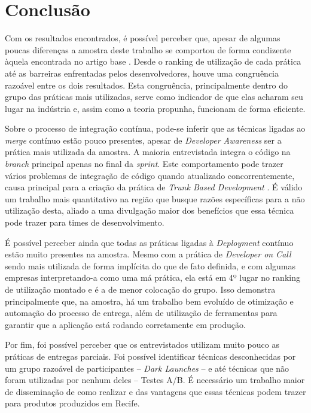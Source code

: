 
\chapter{Conclusão}

Com os resultados encontrados, é possível perceber que, apesar de algumas poucas diferenças a amostra deste trabalho se comportou de forma condizente àquela encontrada no artigo base \cite{empiricalStudy2016}. Desde o ranking de utilização de cada prática até as barreiras enfrentadas pelos desenvolvedores, houve uma congruência razoável entre os dois resultados. Esta congruência, principalmente dentro do grupo das práticas mais utilizadas, serve como indicador de que elas acharam seu lugar na indústria e, assim como a teoria propunha, funcionam de forma eficiente.

Sobre o processo de integração contínua, pode-se inferir que as técnicas ligadas ao \emph{merge} contínuo estão pouco presentes, apesar de \emph{Developer Awareness} ser a prática mais utilizada da amostra. A maioria entrevistada integra o código na \emph{branch} principal apenas no final da \emph{sprint}. Este comportamento pode trazer vários problemas de integração de código quando atualizado concorrentemente, causa principal para a criação da prática de \emph{Trunk Based Development} \cite{devAndDeploymentFB}. É válido um trabalho mais quantitativo na região que busque razões específicas para a não utilização desta, aliado a uma divulgação maior dos benefícios que essa técnica pode trazer para times de desenvolvimento. 

É possível perceber ainda que todas as práticas ligadas à \emph{Deployment} contínuo estão muito presentes na amostra. Mesmo com a prática de \emph{Developer on Call} sendo mais utilizada de forma implícita do que de fato definida, e com algumas empresas interpretando-a como uma má prática, ela está em 4º lugar no ranking de utilização montado e é a de menor colocação do grupo. Isso demonstra principalmente que, na amostra, há um trabalho bem evoluído de otimização e automação do processo de entrega, além de utilização de ferramentas para garantir que a aplicação está rodando corretamente em produção.

Por fim, foi possível perceber que os entrevistados utilizam muito pouco as práticas de entregas parciais. Foi possível identificar técnicas desconhecidas por um grupo razoável de participantes -- \emph{Dark Launches} -- e até técnicas que não foram utilizadas por nenhum deles -- Testes A/B. É necessário um trabalho maior de disseminação de como realizar e das vantagens que essas técnicas podem trazer para produtos produzidos em Recife.

